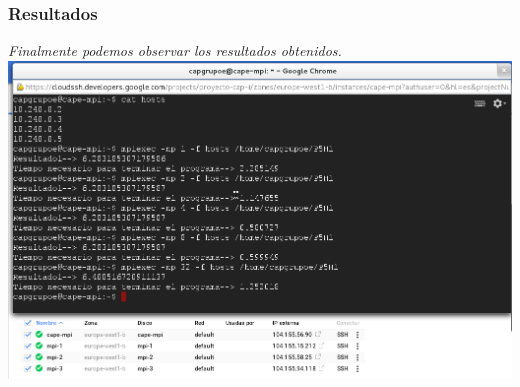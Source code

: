 \documentclass[10pt]{beamer}
\begin{document}
\begin{frame}[fragile] 
  \frametitle{Resultados}
  \emph{
    Finalmente podemos observar los resultados obtenidos.
    \vspace*{30px}
    \includegraphics[scale=0.3]{resultado.png}
  }
\end{frame}
\end{document}
